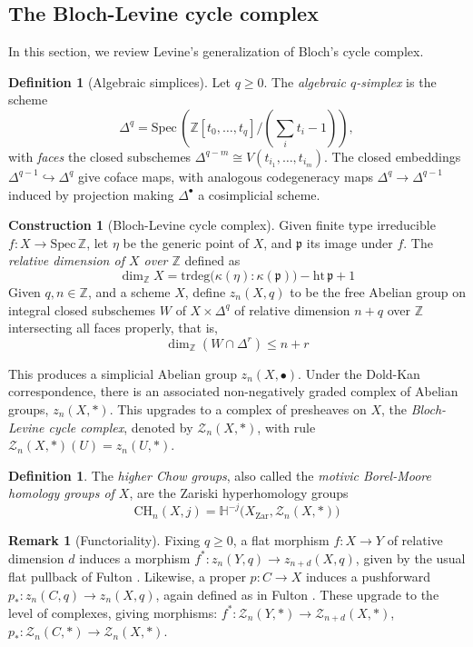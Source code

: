 \documentclass[11pt, twoside]{article}
\numberwithin{equation}{section}
\theoremstyle{definition}
\newtheorem{definition}[equation]{Definition}
\newtheorem{construction}[equation]{Construction}
\newtheorem{remark}[equation]{Remark}
\newcommand{\bb}[1]{\mathbb{#1}}
\newcommand{\p}{\mathfrak{p}}
\newcommand{\spec}{\mathrm{Spec} \,}
\newcommand{\trd}{\mathrm{trdeg}}
\begin{document}
\subsection{The Bloch-Levine cycle complex}
In this section, we review Levine's generalization \cite{LevTechLoc} of Bloch's cycle complex.

\begin{definition}[Algebraic simplices] Let \(q \geq 0\). The \emph{algebraic \(q\)-simplex} is the scheme
\[\Delta^q = \spec \! \left(\bb{Z}[t_0, \dots , t_q] \big/ \left(\sum_i t_i - 1\right)\right),\]
with \emph{faces} the closed subschemes \(\Delta^{q - m} \cong V(t_{i_1}, \dots , t_{i_m})\). The closed embeddings \(\Delta^{q - 1} \hookrightarrow \Delta^q\) give coface maps, with analogous codegeneracy maps \(\Delta^q \to \Delta^{q - 1}\) induced by projection making \(\Delta^\bullet\) a cosimplicial scheme.
\end{definition}

\begin{construction}[Bloch-Levine cycle complex]\label{def:LCC}
Given finite type irreducible \(f \colon X \to \spec \bb{Z}\), let \(\eta\) be the generic point of \(X\), and \(\p\) its image under \(f\). The \emph{relative dimension of \(X\) over \(\bb{Z}\)} defined as 
\[\dim_\bb{Z} X = \trd \big(\kappa(\eta) : \kappa(\p)\big) - \mathrm{ht} \, \p + 1\]
Given \(q, n \in \bb{Z}\), and a scheme \(X\), define \(z_n(X, q)\) to be the free Abelian group on integral closed subschemes \(W\) of \(X \times \Delta^q\) of relative dimension \(n + q\) over \(\bb{Z}\) intersecting all faces properly, that is, 
\[\dim_\bb{Z} (W \cap \Delta^r) \leq n + r\]

This produces a simplicial Abelian group \(z_n(X, \bullet)\). Under the Dold-Kan correspondence, there is an associated non-negatively graded complex of Abelian groups, \(z_n(X, *)\). This upgrades to a complex of presheaves on \(X\), the \emph{Bloch-Levine cycle complex}, denoted by \(\mathcal{Z}_n(X, *)\), with rule \(\mathcal{Z}_n(X, *)(U) = z_n(U, *)\).
\end{construction}

\begin{definition} The \emph{higher Chow groups}, also called the \emph{motivic Borel-Moore homology groups of \(X\)}, are the Zariski hyperhomology groups 
\[\mathrm{CH}_n(X, j) = \bb{H}^{- j}\big(X_\mathrm{Zar}, \mathcal{Z}_n(X, *)\big)\]
\end{definition}

\begin{remark}[Functoriality]
Fixing \(q \geq 0\), a flat morphism \(f \colon X \to Y\) of relative dimension \(d\) induces a morphism \(f^* \colon z_n(Y, q) \to z_{n + d}(X, q)\), given by the usual flat pullback of Fulton \cite[1.7]{Ful}. Likewise, a proper \(p \colon C \to X\) induces a pushforward \(p_* \colon z_n(C, q) \to z_n(X, q)\), again defined as in Fulton \cite[1.4]{Ful}. These upgrade to the level of complexes, giving morphisms: \(f^* \colon \mathcal{Z}_n(Y, *) \to \mathcal{Z}_{n + d}(X, *)\),  \(p_* \colon \mathcal{Z}_n(C, *) \to \mathcal{Z}_n(X, *)\).
\end{remark}
\end{document}
